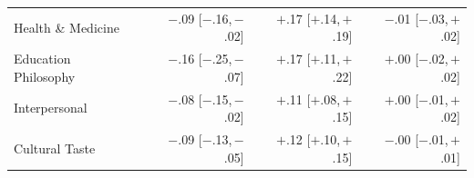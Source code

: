 \begin{table}[h]
\begin{tabular}{l r r r}
Health \& Medicine & $-$.09 \scriptsize{[$-$.16,\,$-$.02]} & $+$.17 \scriptsize{[$+$.14,\,$+$.19]} & $-$.01 \scriptsize{[$-$.03,\,$+$.02]} \\
Education Philosophy & $-$.16 \scriptsize{[$-$.25,\,$-$.07]} & $+$.17 \scriptsize{[$+$.11,\,$+$.22]} & $+$.00 \scriptsize{[$-$.02,\,$+$.02]} \\
Interpersonal & $-$.08 \scriptsize{[$-$.15,\,$-$.02]} & $+$.11 \scriptsize{[$+$.08,\,$+$.15]} & $+$.00 \scriptsize{[$-$.01,\,$+$.02]} \\
Cultural Taste & $-$.09 \scriptsize{[$-$.13,\,$-$.05]} & $+$.12 \scriptsize{[$+$.10,\,$+$.15]} & $-$.00 \scriptsize{[$-$.01,\,$+$.01]} \\
\bottomrule
\end{tabular}
\end{table}
